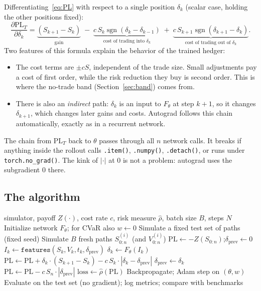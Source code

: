 \documentclass[11pt]{article}
\theoremstyle{definition}
\theoremstyle{remark}
\newcommand{\PL}{\mathrm{PL}}
\newcommand{\sgn}{\operatorname{sgn}}
\begin{document}
Differentiating~\eqref{eq:PL} with respect to a single position $\delta_k$ (scalar case, holding the other positions fixed):
\[
\frac{\partial\PL_T}{\partial\delta_k}
=\underbrace{(S_{k+1}-S_k)}_{\text{gain}}
\;-\;\underbrace{c\,S_k\sgn(\delta_k-\delta_{k-1})}_{\text{cost of trading into }\delta_k}
\;+\;\underbrace{c\,S_{k+1}\sgn(\delta_{k+1}-\delta_k)}_{\text{cost of trading out of }\delta_k}.
\]
Two features of this formula explain the behavior of the trained hedger:
\begin{itemize}[leftmargin=*]
  \item The cost terms are $\pm cS$, independent of the trade size. Small adjustments pay a cost of first order, while the
        risk reduction they buy is second order. This is where the no-trade band (Section~\ref{sec:band}) comes from.
  \item There is also an \emph{indirect} path: $\delta_k$ is an input to $F_\theta$ at step $k+1$, so it changes $\delta_{k+1}$, which
        changes later gains and costs. Autograd follows this chain automatically, exactly as in a recurrent network.
\end{itemize}
The chain from $\PL_T$ back to $\theta$ passes through all $n$ network calls. It breaks if anything inside the
rollout calls \texttt{.item()}, \texttt{.numpy()}, \texttt{.detach()}, or runs under \texttt{torch.no\_grad()}.
The kink of $|\cdot|$ at $0$ is not a problem: autograd uses the subgradient $0$ there.

\subsection{The algorithm}

\begin{algorithm}[H]
\caption{Deep hedging (training)}
\begin{algorithmic}[1]
\Require simulator, payoff $Z(\cdot)$, cost rate $c$, risk measure $\hat\rho$, batch size $B$, steps $N$
\State Initialize network $F_\theta$; for CVaR also $w\leftarrow0$
\State Simulate a fixed test set of paths (fixed seed)
  \State Simulate $B$ fresh paths $S^{(i)}_{0:n}$ (and $V^{(i)}_{0:n}$)
  \State $\PL\leftarrow-Z(S_{0:n})$;\quad $\delta_{\text{prev}}\leftarrow0$
    \State $I_k\leftarrow\texttt{features}(S_k,V_k,t_k,\delta_{\text{prev}})$ 
    \State $\delta_k\leftarrow F_\theta(I_k)$ 
    \State $\PL\leftarrow\PL+\delta_k\cdot(S_{k+1}-S_k)-c\,S_k\cdot|\delta_k-\delta_{\text{prev}}|$
    \State $\delta_{\text{prev}}\leftarrow\delta_k$
  \EndFor
  \State $\PL\leftarrow\PL-c\,S_n\cdot|\delta_{\text{prev}}|$
  \State $\text{loss}\leftarrow\hat\rho(\PL)$
  \State Backpropagate; Adam step on $(\theta,w)$
    \State Evaluate on the test set (no gradient); log metrics; compare with benchmarks
  \EndIf
\EndFor
\end{algorithmic}
\end{algorithm}
\end{document}
